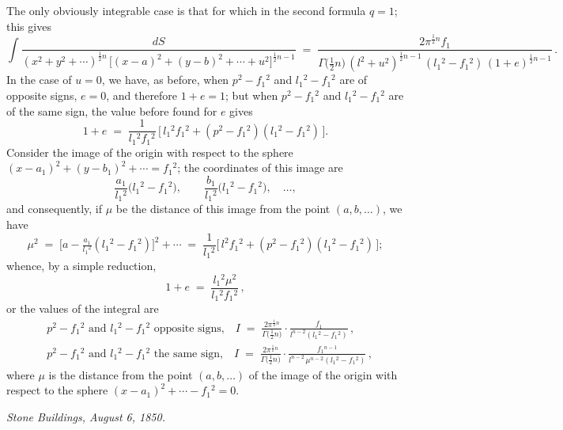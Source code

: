 \documentclass[11pt]{article}
\begin{document}
The only obviously integrable case is that for which in the second formula $q = 1$; this gives
\[
\int \frac{dS}{(x^{2}+y^{2}+\cdots)^{\frac{1}{2}n}\,\bigl[(x-a)^{2}+(y-b)^{2}+\cdots+u^{2}\bigr]^{\frac{1}{2}n-1}}
\;=\;
\frac{2\pi^{\frac{1}{2}n}f_{1}}{\Gamma\!\bigl(\tfrac{1}{2}n\bigr)\,(l^{2}+u^{2})^{\frac{1}{2}n-1}\,(l_{1}{}^{2}-f_{1}{}^{2})\,(1+e)^{\frac{1}{2}n-1}}\,.
\]
In the case of $u = 0$, we have, as before, when $p^{2} - f_{1}{}^{2}$ and $l_{1}{}^{2} - f_{1}{}^{2}$ are of opposite signs, $e = 0$, and therefore $1 + e = 1$; but when $p^{2}-f_{1}{}^{2}$ and $l_{1}{}^{2}-f_{1}{}^{2}$ are of the same sign, the value before found for $e$ gives
\[
1 + e \;=\; \frac{1}{l_{1}{}^{2}f_{1}{}^{2}}\,\bigl[\,l_{1}{}^{2}f_{1}{}^{2} + (p^{2}-f_{1}{}^{2})(l_{1}{}^{2}-f_{1}{}^{2})\,\bigr].
\]
Consider the image of the origin with respect to the sphere $(x-a_{1})^{2} + (y-b_{1})^{2} + \cdots = f_{1}{}^{2}$; the coordinates of this image are
\[
\frac{a_{1}}{l_{1}{}^{2}}\bigl(l_{1}{}^{2}-f_{1}{}^{2}\bigr),\qquad \frac{b_{1}}{l_{1}{}^{2}}\bigl(l_{1}{}^{2}-f_{1}{}^{2}\bigr),\quad\ldots,
\]
and consequently, if $\mu$ be the distance of this image from the point $(a, b, \ldots)$, we have
\[
\mu^{2} \;=\; \bigl[a - \tfrac{a_{1}}{l_{1}{}^{2}}(l_{1}{}^{2}-f_{1}{}^{2})\bigr]^{2} + \cdots
       \;=\; \frac{1}{l_{1}{}^{2}}\bigl[\,l^{2} f_{1}{}^{2} + (p^{2}-f_{1}{}^{2})(l_{1}{}^{2}-f_{1}{}^{2})\,\bigr];
\]
whence, by a simple reduction,
\[
1 + e \;=\; \frac{l_{1}{}^{2} \mu^{2}}{l_{1}{}^{2} f_{1}{}^{2}}\,,
\]
or the values of the integral are
\begin{align*}
&p^{2} - f_{1}{}^{2} \text{ and } l_{1}{}^{2} - f_{1}{}^{2} \text{ opposite signs,}\quad
   I \;=\; \frac{2\pi^{\frac{1}{2}n}}{\Gamma\!\bigl(\tfrac{1}{2}n\bigr)}\cdot\frac{f_{1}}{l^{n-2}(l_{1}{}^{2}-f_{1}{}^{2})}\,,\\[3pt]
&p^{2} - f_{1}{}^{2} \text{ and } l_{1}{}^{2} - f_{1}{}^{2} \text{ the same sign,}\quad
   I \;=\; \frac{2\pi^{\frac{1}{2}n}}{\Gamma\!\bigl(\tfrac{1}{2}n\bigr)}\cdot\frac{f_{1}{}^{n-1}}{l^{n-2}\,\mu^{n-2}(l_{1}{}^{2}-f_{1}{}^{2})}\,,
\end{align*}
where $\mu$ is the distance from the point $(a, b, \ldots)$ of the image of the origin with respect to the sphere $(x-a_{1})^{2} + \cdots - f_{1}{}^{2} = 0$.

\bigskip

\noindent\emph{Stone Buildings, August 6, 1850.}

\clearpage

\end{document}
